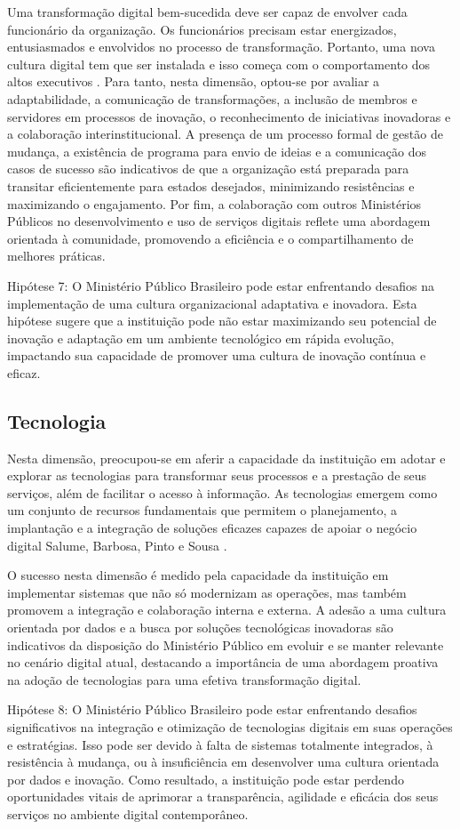 Uma transformação digital bem-sucedida deve ser capaz de envolver cada funcionário da organização. Os funcionários precisam estar energizados, entusiasmados e envolvidos no processo de transformação. Portanto, uma nova cultura digital tem que ser instalada e isso começa com o comportamento dos altos executivos \cite{Hie_2019}. Para tanto, nesta dimensão, optou-se por avaliar a adaptabilidade, a comunicação de transformações, a inclusão de membros e servidores em processos de inovação, o reconhecimento de iniciativas inovadoras e a colaboração interinstitucional. 
A presença de um processo formal de gestão de mudança, a existência de programa para envio de ideias e a comunicação dos casos de sucesso são indicativos de que a organização está preparada para transitar eficientemente para estados desejados, minimizando resistências e maximizando o engajamento. Por fim, a colaboração com outros Ministérios Públicos no desenvolvimento e uso de serviços digitais reflete uma abordagem orientada à comunidade, promovendo a eficiência e o compartilhamento de melhores práticas.

Hipótese 7: O Ministério Público Brasileiro pode estar enfrentando desafios na implementação de uma cultura organizacional adaptativa e inovadora. Esta hipótese sugere que a instituição pode não estar maximizando seu potencial de inovação e adaptação em um ambiente tecnológico em rápida evolução, impactando sua capacidade de promover uma cultura de inovação contínua e eficaz.

\subsection{Tecnologia}

Nesta dimensão, preocupou-se em aferir a capacidade da instituição em adotar e explorar as tecnologias para transformar seus processos e a prestação de seus serviços, além de facilitar o acesso à informação. As tecnologias emergem como um conjunto de recursos fundamentais que permitem o planejamento, a implantação e a integração de soluções eficazes capazes de apoiar o negócio digital Salume, Barbosa, Pinto e Sousa \cite{salume2021key}. 

O sucesso nesta dimensão é medido pela capacidade da instituição em implementar sistemas que não só modernizam as operações, mas também promovem a integração e colaboração interna e externa. A adesão a uma cultura orientada por dados e a busca por soluções tecnológicas inovadoras são indicativos da disposição do Ministério Público em evoluir e se manter relevante no cenário digital atual, destacando a importância de uma abordagem proativa na adoção de tecnologias para uma efetiva transformação digital.

Hipótese 8: O Ministério Público Brasileiro pode estar enfrentando desafios significativos na integração e otimização de tecnologias digitais em suas operações e estratégias. Isso pode ser devido à falta de sistemas totalmente integrados, à resistência à mudança, ou à insuficiência em desenvolver uma cultura orientada por dados e inovação. Como resultado, a instituição pode estar perdendo oportunidades vitais de aprimorar a transparência, agilidade e eficácia dos seus serviços no ambiente digital contemporâneo.